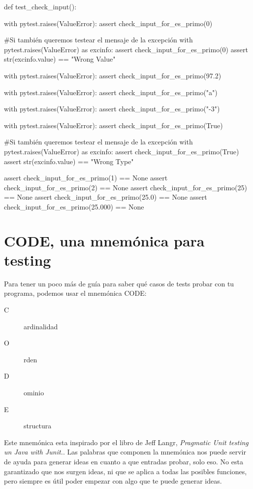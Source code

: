 \begin{python}
def test_check_input():

    with pytest.raises(ValueError):
        assert check_input_for_es_primo(0)

    #Si también queremos testear el mensaje de la excepción
    with pytest.raises(ValueError) as excinfo:
        assert check_input_for_es_primo(0)
    assert str(excinfo.value) == "Wrong Value"
    
    with pytest.raises(ValueError):
        assert check_input_for_es_primo(97.2)

    with pytest.raises(ValueError):
        assert check_input_for_es_primo("a")

    with pytest.raises(ValueError):
        assert check_input_for_es_primo("-3")

    with pytest.raises(ValueError):
        assert check_input_for_es_primo(True)
    
    #Si también queremos testear el mensaje de la excepción
    with pytest.raises(ValueError) as excinfo:
         assert check_input_for_es_primo(True)
    assert str(excinfo.value) == "Wrong Type"
    
    assert check_input_for_es_primo(1)    == None
    assert check_input_for_es_primo(2)    == None
    assert check_input_for_es_primo(25)   == None
    assert check_input_for_es_primo(25.0)   == None
    assert check_input_for_es_primo(25.000)   == None
\end{python}



\section{CODE, una mnemónica para testing}\label{test-mnemonic}

Para tener un poco más de guía para saber qué casos de tests probar con tu programa, podemos usar el mnemónica CODE:

\begin{description}
\item[{\color{red} C}]ardinalidad
\item[{\color{red} O}]rden
\item[{\color{red} D}]ominio
\item[{\color{red} E}]structura
\end{description}

Este mnemónica esta inspirado por el libro de Jeff Langr, {\em Pragmatic Unit testing un Java with Junit.}. Las palabras que componen la mnemónica nos puede servir de ayuda para generar ideas en cuanto a que entradas probar, solo eso. No esta garantizado que nos surgen ideas, ni que se aplica a todas las posibles funciones, pero siempre es útil poder empezar con algo que te puede generar ideas.

